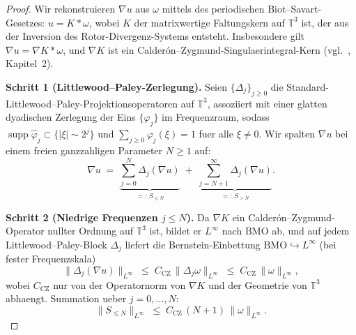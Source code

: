 \documentclass[12pt,a4paper]{article}
\theoremstyle{definition}
\theoremstyle{plain}
\theoremstyle{remark}
\begin{document}
\begin{proof}
Wir rekonstruieren $\nabla u$ aus $\omega$ mittels des periodischen Biot--Savart-Gesetzes:
$u = K * \omega$, wobei $K$ der matrixwertige Faltungskern auf
$\mathbb{T}^3$ ist, der aus der Inversion des Rotor-Divergenz-Systems entsteht.
Insbesondere gilt $\nabla u = \nabla K * \omega$, und $\nabla K$ ist ein
Calder\'{o}n--Zygmund-Singulaerintegral-Kern (vgl.\ \cite{BertozziMajda2002},
Kapitel~2).

\medskip
\noindent\textbf{Schritt 1 (Littlewood--Paley-Zerlegung).}
Seien $\{\Delta_j\}_{j\ge 0}$ die Standard-Littlewood--Paley-Projektionsoperatoren
auf $\mathbb{T}^3$, assoziiert mit einer glatten dyadischen Zerlegung der Eins
$\{\varphi_j\}$ im Frequenzraum, sodass
$\operatorname{supp}\hat\varphi_j \subset \{|\xi| \sim 2^j\}$ und
$\sum_{j\ge 0}\varphi_j(\xi) = 1$ fuer alle $\xi \neq 0$.
Wir spalten $\nabla u$ bei einem freien ganzzahligen Parameter $N \ge 1$ auf:
\[
    \nabla u \;=\; \underbrace{\sum_{j=0}^{N} \Delta_j(\nabla u)}_{=:\,S_{\le N}}
                  \;+\; \underbrace{\sum_{j=N+1}^{\infty} \Delta_j(\nabla u)}_{=:\,S_{>N}}.
\]

\medskip
\noindent\textbf{Schritt 2 (Niedrige Frequenzen $j \le N$).}
Da $\nabla K$ ein Calder\'{o}n--Zygmund-Operator nullter Ordnung auf
$\mathbb{T}^3$ ist, bildet er $L^\infty$ nach $\mathrm{BMO}$ ab, und auf jedem Littlewood--Paley-Block $\Delta_j$ liefert die Bernstein-Einbettung
$\mathrm{BMO} \hookrightarrow L^\infty$ (bei fester Frequenzskala)
\[
    \|\Delta_j(\nabla u)\|_{L^\infty}
    \;\le\; C_{\mathrm{CZ}}\,\|\Delta_j \omega\|_{L^\infty}
    \;\le\; C_{\mathrm{CZ}}\,\|\omega\|_{L^\infty},
\]
wobei $C_{\mathrm{CZ}}$ nur von der Operatornorm von $\nabla K$ und
der Geometrie von $\mathbb{T}^3$ abhaengt. Summation ueber $j = 0, \ldots, N$:
\begin{equation}\label{eq:BS-low}
    \|S_{\le N}\|_{L^\infty}
    \;\le\; C_{\mathrm{CZ}}\,(N+1)\,\|\omega\|_{L^\infty}.
\end{equation}


\end{proof}
\end{document}
